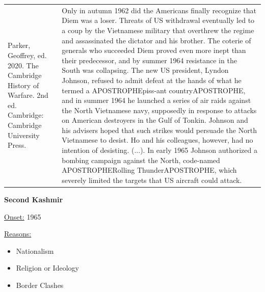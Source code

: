 {\begin{longtable}{p{}p{}}
Parker, Geoffrey, ed. 2020. The Cambridge History of Warfare. 2nd ed. Cambridge: Cambridge University Press. & Only in autumn 1962 did the Americans finally recognize that Diem was a loser. Threats of US withdrawal eventually led to a coup by the Vietnamese military that overthrew the regime and assassinated the dictator and his brother. The coterie of generals who succeeded Diem proved even more inept than their predecessor, and by summer 1964 resistance in the South was collapsing. The new US president, Lyndon Johnson, refused to admit defeat at the hands of what he termed a APOSTROPHEpiss-ant countryAPOSTROPHE, and in summer 1964 he launched a series of air raids against the North Vietnamese navy, supposedly in response to attacks on American destroyers in the Gulf of Tonkin. Johnson and his advisers hoped that such strikes would persuade the North Vietnamese to desist. Ho and his colleagues, however, had no intention of desisting. (...). In early 1965 Johnson authorized a bombing campaign against the North, code-named APOSTROPHERolling ThunderAPOSTROPHE, which severely limited the targets that US aircraft could attack.  
\\
\end{longtable}}
\clearpage
         \textbf{Second Kashmir} 

          \underline{Onset:} 1965         

\underline{Reasons:}
\begin{itemize}
\item Nationalism
\item Religion or Ideology
\item Border Clashes
\end{itemize}


